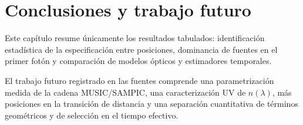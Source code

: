 \chapter{Conclusiones y trabajo futuro}
Este capítulo resume únicamente los resultados tabulados: identificación estadística de la especificación entre posiciones, dominancia de fuentes en el primer fotón y comparación de modelos ópticos y estimadores temporales.

El trabajo futuro registrado en las fuentes comprende una parametrización medida de la cadena MUSIC/SAMPIC, una caracterización UV de $n(\lambda)$, más posiciones en la transición de distancia y una separación cuantitativa de términos geométricos y de selección en el tiempo efectivo.

